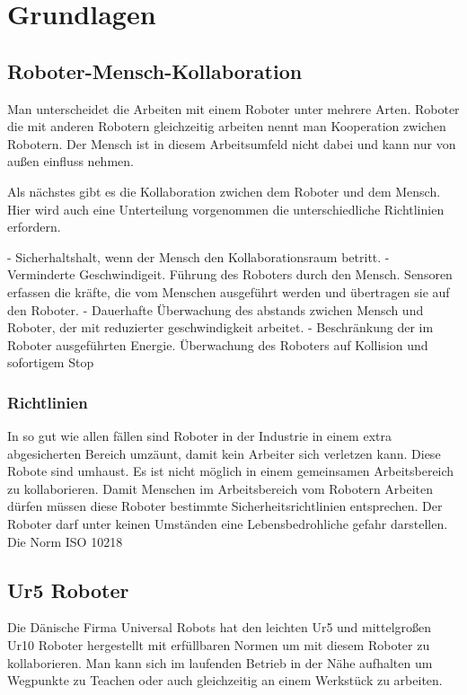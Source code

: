 \chapter{Grundlagen}

\section{Roboter-Mensch-Kollaboration}
\label{sec:roboter-mensch-kollaboration_gru}

Man unterscheidet die Arbeiten mit einem Roboter unter mehrere Arten.
Roboter die mit anderen Robotern gleichzeitig arbeiten nennt man Kooperation zwichen Robotern.
Der Mensch ist in diesem Arbeitsumfeld nicht dabei und kann nur von außen einfluss nehmen.

Als nächstes gibt es die Kollaboration zwichen dem Roboter und dem Mensch. 
Hier wird auch eine Unterteilung vorgenommen die unterschiedliche Richtlinien erfordern.

- Sicherhaltshalt, wenn der Mensch den Kollaborationsraum betritt.
- Verminderte Geschwindigeit. Führung des Roboters durch den Mensch. Sensoren erfassen die kräfte, die vom Menschen ausgeführt werden und übertragen sie auf den Roboter.
- Dauerhafte Überwachung des abstands zwichen Mensch und Roboter, der mit reduzierter geschwindigkeit arbeitet.
- Beschränkung der im Roboter ausgeführten Energie. Überwachung des Roboters auf Kollision und sofortigem Stop

\subsection{Richtlinien}
\label{kol_richtlinien_gru}

In so gut wie allen fällen sind Roboter in der Industrie in einem extra abgesicherten Bereich umzäunt, damit kein Arbeiter sich verletzen kann. Diese Robote sind umhaust. Es ist nicht möglich in einem gemeinsamen Arbeitsbereich zu kollaborieren. 
Damit Menschen im Arbeitsbereich vom Robotern Arbeiten dürfen müssen diese Roboter bestimmte Sicherheitsrichtlinien entsprechen.
Der Roboter darf unter keinen Umständen eine Lebensbedrohliche gefahr darstellen. Die Norm ISO 10218

\section{Ur5 Roboter}
\label{sec:ur_robot_gru}

Die Dänische Firma Universal Robots hat den leichten Ur5 und mittelgroßen Ur10 Roboter hergestellt mit erfüllbaren Normen um mit diesem Roboter zu kollaborieren. Man kann sich im laufenden Betrieb in der Nähe aufhalten um Wegpunkte zu Teachen oder auch gleichzeitig an einem Werkstück zu arbeiten. 

